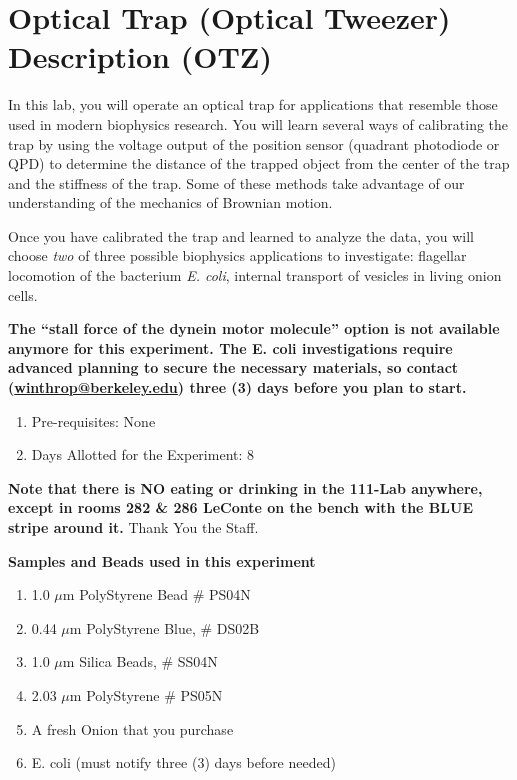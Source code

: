 \documentclass{../lab}
\begin{document}
\maketitle

\tableofcontents

\section{Optical Trap (Optical Tweezer) Description (OTZ)}

In this lab, you will operate an optical trap for applications that resemble those used in modern biophysics research. You will learn several ways of calibrating the trap by using the voltage output of the position sensor (quadrant photodiode or QPD) to determine the distance of the trapped object from the center of the trap and the stiffness of the trap. Some of these methods take advantage of our understanding of the mechanics of Brownian motion.

Once you have calibrated the trap and learned to analyze the data, you will choose \emph{two} of three possible biophysics applications to investigate: flagellar locomotion of the bacterium \emph{E. coli}, internal transport of vesicles in living onion cells.

\textbf{The ``stall force of the dynein motor molecule'' option is not available anymore for this experiment. The E. coli  investigations require advanced planning to secure the necessary materials, so contact \LabEngineer (\href{\MailWinthropWilliams}{\textbf{winthrop@berkeley.edu}}) three (3) days before you plan to start.}

\begin{enumerate}
    \item Pre-requisites: None

    \item Days Allotted for the Experiment: 8
\end{enumerate}

\textbf{Note that there is NO eating or drinking in the 111-Lab anywhere, except in rooms 282 \& 286 LeConte on the bench with the BLUE stripe around it.} Thank You the Staff.

\newpage

\textbf{Samples and Beads used in this experiment}

\begin{enumerate}
    \item 1.0 $\mu$m PolyStyrene Bead \# PS04N

    \item 0.44 $\mu$m PolyStyrene Blue, \# DS02B

    \item 1.0 $\mu$m Silica Beads, \# SS04N

    \item 2.03 $\mu$m PolyStyrene \# PS05N

    \item A fresh Onion that you purchase

    \item E. coli (must notify \LabEngineer three (3) days before needed)
\end{enumerate}
\end{document}
